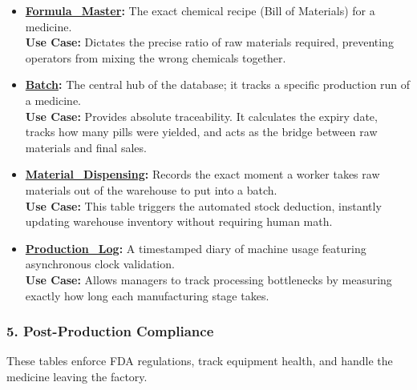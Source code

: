 \documentclass[12pt, a4paper]{article}
\begin{document}
\begin{itemize}
    \item[$\rightarrow$] \textbf{\underline{Formula\_Master}:} The exact chemical recipe (Bill of Materials) for a medicine.
    \\ \textbf{Use Case:} Dictates the precise ratio of raw materials required, preventing operators from mixing the wrong chemicals together.
    
    \item[$\rightarrow$] \textbf{\underline{Batch}:} The central hub of the database; it tracks a specific production run of a medicine.
    \\ \textbf{Use Case:} Provides absolute traceability. It calculates the expiry date, tracks how many pills were yielded, and acts as the bridge between raw materials and final sales.
    
    \item[$\rightarrow$] \textbf{\underline{Material\_Dispensing}:} Records the exact moment a worker takes raw materials out of the warehouse to put into a batch.
    \\ \textbf{Use Case:} This table triggers the automated stock deduction, instantly updating warehouse inventory without requiring human math.
    
    \item[$\rightarrow$] \textbf{\underline{Production\_Log}:} A timestamped diary of machine usage featuring asynchronous clock validation.
    \\ \textbf{Use Case:} Allows managers to track processing bottlenecks by measuring exactly how long each manufacturing stage takes.
\end{itemize}

\subsubsection*{5. Post-Production Compliance}
These tables enforce FDA regulations, track equipment health, and handle the medicine leaving the factory.
\end{document}
